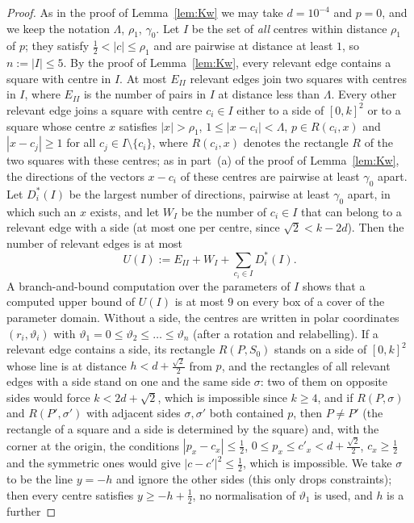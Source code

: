 \documentclass[11pt]{amsart}
\theoremstyle{definition}
\theoremstyle{remark}
\begin{document}
\begin{proof}
As in the proof of Lemma~\ref{lem:Kw} we may take $d=10^{-4}$ and $p=0$, and we keep the notation $\Lambda$, $\rho_1$, $\gamma_0$.
Let $I$ be the set of \emph{all} centres within distance $\rho_1$ of $p$; they satisfy $\frac12<|c|\le\rho_1$ and are pairwise at
distance at least $1$, so $n:=|I|\le5$. By the proof of Lemma~\ref{lem:Kw}, every relevant edge contains a square with centre in
$I$. At most $E_{II}$ relevant edges join two squares with centres in $I$, where $E_{II}$ is the number of pairs in $I$ at distance
less than $\Lambda$. Every other relevant edge joins a square with centre $c_i\in I$ either to a side of $[0,k]^2$ or to a square whose
centre $x$ satisfies $|x|>\rho_1$, $1\le|x-c_i|<\Lambda$, $p\in R(c_i,x)$ and $|x-c_j|\ge1$ for all $c_j\in I\setminus\{c_i\}$, where
$R(c_i,x)$ denotes the rectangle $R$ of the two squares with these centres; as in part~(a) of
the proof of Lemma~\ref{lem:Kw}, the directions of the vectors $x-c_i$ of these centres are pairwise at least $\gamma_0$ apart. Let $D_i^*(I)$
be the largest number of directions, pairwise at least $\gamma_0$ apart, in which such an $x$ exists, and let $W_I$ be the number of
$c_i\in I$ that can belong to a relevant edge with a side (at most one per centre, since $\sqrt2<k-2d$). Then the number of relevant
edges is at most
\[
U(I):=E_{II}+W_I+\sum_{c_i\in I}D_i^*(I) .
\]
A branch-and-bound computation over the parameters of $I$ shows that a computed upper bound of $U(I)$ is at most $9$ on every
box of a cover of the parameter domain. Without a side,
the centres are written in polar coordinates $(r_i,\vartheta_i)$ with $\vartheta_1=0\le\vartheta_2\le\dots\le\vartheta_n$ (after a rotation and
relabelling). If a relevant edge contains a side, its rectangle $R(P,S_0)$ stands on a side of $[0,k]^2$ whose line is at
distance $h<d+\frac{\sqrt2}2$ from $p$, and the rectangles of all relevant edges with a side stand on one and the same side $\sigma$: two of them on opposite sides would force
$k<2d+\sqrt2$, which is impossible since $k\ge4$, and if $R(P,\sigma)$ and $R(P',\sigma')$ with adjacent sides $\sigma,\sigma'$ both contained $p$, then $P\ne P'$ (the rectangle of a square and a side is determined by the square) and, with the
corner at the origin, the conditions $|p_x-c_x|\le\frac12$, $0\le p_x\le c'_x<d+\frac{\sqrt2}2$, $c_x\ge\frac12$ and the symmetric ones would give
$|c-c'|^2\le\frac12$, which is impossible. We take $\sigma$ to be the line $y=-h$ and ignore the other sides (this only drops constraints); then every centre satisfies $y\ge-h+\frac12$, no normalisation of $\vartheta_1$ is used, and $h$ is a further

\end{proof}
\end{document}

